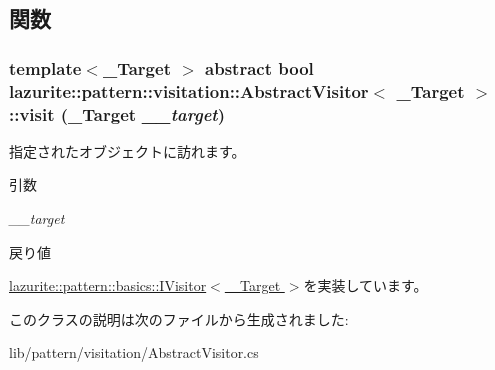 \subsection{関数}
\hypertarget{classlazurite_1_1pattern_1_1visitation_1_1_abstract_visitor_3_01___target_01_4_a82376a3bfa3b8356c6557cf30a0c0f9d}{
\subsubsection[{visit}]{\setlength{\rightskip}{0pt plus 5cm}template$<$\_\-Target $>$ abstract bool {\bf lazurite::pattern::visitation::AbstractVisitor}$<$ \_\-Target $>$::visit (\_\-Target {\em \_\-\_\-target})}}
\label{classlazurite_1_1pattern_1_1visitation_1_1_abstract_visitor_3_01___target_01_4_a82376a3bfa3b8356c6557cf30a0c0f9d}


指定されたオブジェクトに訪れます。 
\begin{DoxyParams}{引数}
\item[{\em \_\-\_\-target}]\end{DoxyParams}
\begin{DoxyReturn}{戻り値}

\end{DoxyReturn}


\hyperlink{interfacelazurite_1_1pattern_1_1basics_1_1_i_visitor_3_01___target_01_4_a9bf1df40e033ad9aec0a33bf6b426eca}{lazurite::pattern::basics::IVisitor$<$ \_\-Target $>$}を実装しています。

このクラスの説明は次のファイルから生成されました:\begin{DoxyCompactItemize}
\item 
lib/pattern/visitation/AbstractVisitor.cs\end{DoxyCompactItemize}
